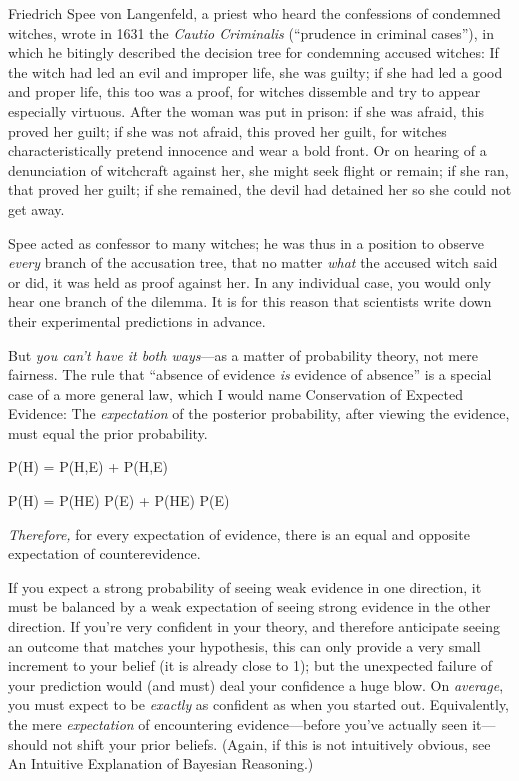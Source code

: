 \myendsectiontext


\bigskip


{
 Friedrich Spee von Langenfeld, a priest who heard the confessions
of condemned witches, wrote in 1631 the \textit{Cautio Criminalis}
(``prudence in criminal cases''), in
which he bitingly described the decision tree for condemning accused
witches: If the witch had led an evil and improper life, she was
guilty; if she had led a good and proper life, this too was a proof,
for witches dissemble and try to appear especially virtuous. After the
woman was put in prison: if she was afraid, this proved her guilt; if
she was not afraid, this proved her guilt, for witches
characteristically pretend innocence and wear a bold front. Or on
hearing of a denunciation of witchcraft against her, she might seek
flight or remain; if she ran, that proved her guilt; if she remained,
the devil had detained her so she could not get away. }

{
 Spee acted as confessor to many witches; he was thus in a position
to observe \textit{every} branch of the accusation tree, that no matter
\textit{what} the accused witch said or did, it was held as proof
against her. In any individual case, you would only hear one branch of
the dilemma. It is for this reason that scientists write down their
experimental predictions in advance.}

{
 But \textit{you can't have it both ways}{}---as a
matter of probability theory, not mere fairness. The rule that
``absence of evidence \textit{is} evidence of
absence'' is a special case of a more general law,
which I would name Conservation of Expected Evidence: The
\textit{expectation} of the posterior probability, after viewing the
evidence, must equal the prior probability.}

{\centering
 P(H) = P(H,E) + P(H,{\textlnot}E)
\par}


\bigskip

{\centering
 P(H) = P(H{\textbar}E) {\texttimes} P(E) + P(H{\textbar}{\textlnot}E)
{\texttimes} P({\textlnot}E)
\par}


\bigskip

{
 \textit{Therefore,} for every expectation of evidence, there is an
equal and opposite expectation of counterevidence.}

{
 If you expect a strong probability of seeing weak evidence in one
direction, it must be balanced by a weak expectation of seeing strong
evidence in the other direction. If you're very
confident in your theory, and therefore anticipate seeing an outcome
that matches your hypothesis, this can only provide a very small
increment to your belief (it is already close to 1); but the unexpected
failure of your prediction would (and must) deal your confidence a huge
blow. On \textit{average}, you must expect to be \textit{exactly} as
confident as when you started out. Equivalently, the mere
\textit{expectation} of encountering evidence---before
you've actually seen it---should not shift your prior
beliefs. (Again, if this is not intuitively obvious, see An Intuitive
Explanation of Bayesian Reasoning.)}

